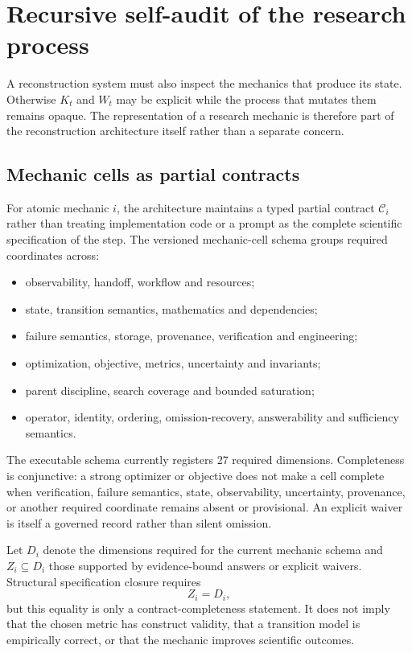 \section{Recursive self-audit of the research process}

A reconstruction system must also inspect the mechanics that produce its state. Otherwise $K_t$ and $W_t$ may be explicit while the process that mutates them remains opaque. The representation of a research mechanic is therefore part of the reconstruction architecture itself rather than a separate concern.

\subsection{Mechanic cells as partial contracts}

For atomic mechanic $i$, the architecture maintains a typed partial contract \(\mathcal C_i\) rather than treating implementation code or a prompt as the complete scientific specification of the step. The versioned mechanic-cell schema groups required coordinates across:

\begin{itemize}
  \item observability, handoff, workflow and resources;
  \item state, transition semantics, mathematics and dependencies;
  \item failure semantics, storage, provenance, verification and engineering;
  \item optimization, objective, metrics, uncertainty and invariants;
  \item parent discipline, search coverage and bounded saturation;
  \item operator, identity, ordering, omission-recovery, answerability and sufficiency semantics.
\end{itemize}

The executable schema currently registers 27 required dimensions. Completeness is conjunctive: a strong optimizer or objective does not make a cell complete when verification, failure semantics, state, observability, uncertainty, provenance, or another required coordinate remains absent or provisional. An explicit waiver is itself a governed record rather than silent omission.

Let \(D_i\) denote the dimensions required for the current mechanic schema and \(Z_i\subseteq D_i\) those supported by evidence-bound answers or explicit waivers. Structural specification closure requires
\[
Z_i=D_i,
\]
but this equality is only a contract-completeness statement. It does not imply that the chosen metric has construct validity, that a transition model is empirically correct, or that the mechanic improves scientific outcomes.

